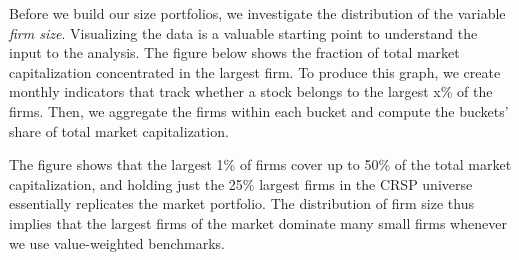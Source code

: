 \documentclass[
]{book}
\begin{document}
Before we build our size portfolios, we investigate the distribution of the variable \emph{firm size}. Visualizing the data is a valuable starting point to understand the input to the analysis. The figure below shows the fraction of total market capitalization concentrated in the largest firm. To produce this graph, we create monthly indicators that track whether a stock belongs to the largest x\% of the firms.
Then, we aggregate the firms within each bucket and compute the buckets' share of total market capitalization.

The figure shows that the largest 1\% of firms cover up to 50\% of the total market capitalization, and holding just the 25\% largest firms in the CRSP universe essentially replicates the market portfolio. The distribution of firm size thus implies that the largest firms of the market dominate many small firms whenever we use value-weighted benchmarks.
\end{document}
